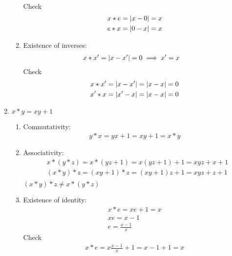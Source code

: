 \documentclass[nohyper,nobib]{tufte-handout}
\theoremstyle{definition}
\theoremstyle{remark}
\begin{document}
\begin{enumerate}
\begin{enumerate}[I]
\begin{align}
                \end{align}
                Check
                \begin{align}
                    &x * e = \abs{x - 0} = x \nonumber \\
                    &e * x = \abs{0 - x} = x
                \end{align}
            \item Existence of inverses:
                \begin{align}
                    &x * x' = \abs{x - x'} = 0  \implies x' = x
                \end{align}
                Check
                \begin{align}
                    &x * x' = \abs{x - x'} = \abs{x - x} = 0 \nonumber \\
                    &x' * x = \abs{x' - x} = \abs{x - x} = 0 
                \end{align}
        \end{enumerate}
    \item $x * y = xy + 1$
        \begin{enumerate}[i]
            \item Commutativity:
                \begin{align}
                    y * x = yx + 1 = xy + 1 = x * y
                \end{align}
            \item Associativity:
                \begin{align}
                    &x * (y * z) = x * (yz + 1) = x(yz + 1) + 1 = xyz + x + 1 \nonumber \\
                    &(x * y) * z = (xy + 1)*z = (xy + 1)z + 1 = xyz + z + 1 \nonumber \\
                \end{align}
                $(x * y) * z \neq x * (y * z)$
            \item Existence of identity:
                \begin{align}
                    x * e =  xe + 1 = x \nonumber \\
                    xe = x - 1  \nonumber \\
                    e = \frac{x-1}{x}
                \end{align}
                Check
                \begin{align}
                    x * e = x\frac{x-1}{x} + 1 = x - 1 + 1 = x \nonumber \\

\end{align}
\end{enumerate}
\end{enumerate}
\end{document}
